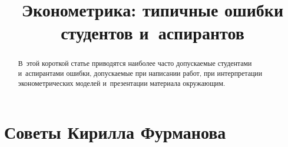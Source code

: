 \documentclass[final,pdftex]{../../template/epsilonj}
\begin{document}
\begin{frontmatter}
\title{Эконометрика: типичные ошибки студентов и~аспирантов}

\begin{aug}
\author{ }%
\author{ }


\address{НИУ ВШЭ, Москва.}
\end{aug}

\begin{abstract}
	В~этой короткой статье приводятся наиболее часто допускаемые студентами и~аспирантами ошибки, допускаемые при написании работ, при интерпретации эконометрических моделей и~презентации материала окружающим. 
\end{abstract}

\begin{keyword}
\end{keyword}

\end{frontmatter}


\section{Советы Кирилла Фурманова}
\end{document}

